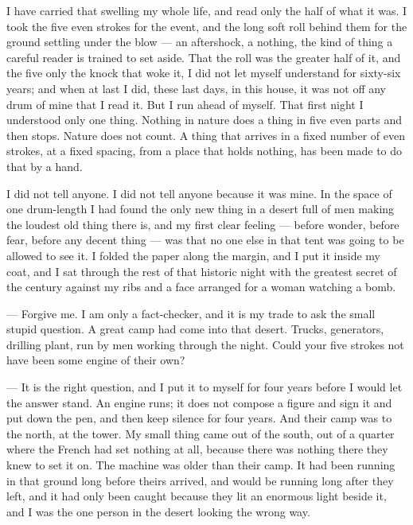 I have carried that swelling my whole life, and read only the half of what it was. I took the five even strokes for the event, and the long soft roll behind them for the ground settling under the blow --- an aftershock, a nothing, the kind of thing a careful reader is trained to set aside. That the roll was the greater half of it, and the five only the knock that woke it, I did not let myself understand for sixty-six years; and when at last I did, these last days, in this house, it was not off any drum of mine that I read it. But I run ahead of myself. That first night I understood only one thing. Nothing in nature does a thing in five even parts and then stops. Nature does not count. A thing that arrives in a fixed number of even strokes, at a fixed spacing, from a place that holds nothing, has been made to do that by a hand.\par

I did not tell anyone. I did not tell anyone because it was mine. In the space of one drum-length I had found the only new thing in a desert full of men making the loudest old thing there is, and my first clear feeling --- before wonder, before fear, before any decent thing --- was that no one else in that tent was going to be allowed to see it. I folded the paper along the margin, and I put it inside my coat, and I sat through the rest of that historic night with the greatest secret of the century against my ribs and a face arranged for a woman watching a bomb.\par

\begin{room}

--- Forgive me. I am only a fact-checker, and it is my trade to ask the small stupid question. A great camp had come into that desert. Trucks, generators, drilling plant, run by men working through the night. Could your five strokes not have been some engine of their own?

--- It is the right question, and I put it to myself for four years before I would let the answer stand. An engine runs; it does not compose a figure and sign it and put down the pen, and then keep silence for four years. And their camp was to the north, at the tower. My small thing came out of the south, out of a quarter where the French had set nothing at all, because there was nothing there they knew to set it on. The machine was older than their camp. It had been running in that ground long before theirs arrived, and would be running long after they left, and it had only been caught because they lit an enormous light beside it, and I was the one person in the desert looking the wrong way.

\end{room}

